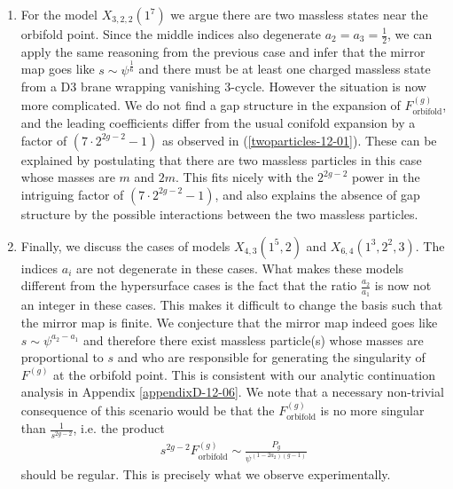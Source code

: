 \documentclass[12pt]{article}
\begin{document}
\begin{enumerate}
\item For the model $X_{3,2,2}(1^7)$ we argue there are two
massless states near the orbifold point. Since the middle indices
also degenerate $a_2=a_3=\frac{1}{2}$, we can apply the same
reasoning from the previous case and infer that the mirror map
goes like $s\sim \psi^{\frac{1}{6}}$ and there must be at
least one charged massless state from a D3 brane wrapping
vanishing 3-cycle. However the situation is now more complicated.
We do not find a gap structure in the expansion of
$F^{(g)}_{\textrm{orbifold}}$, and the leading coefficients differ
from the usual conifold expansion by a factor of $(7\cdot
2^{2g-2}-1)$ as observed in (\ref{twoparticles-12-01}). These can
be explained by postulating that there are two massless particles
in this case whose masses are $m$ and $2m$. This fits nicely with
the $2^{2g-2}$ power in the intriguing factor of $(7\cdot
2^{2g-2}-1)$, and also explains the absence of gap structure by
the possible interactions between the two massless particles.

\item Finally, we discuss the cases of models $X_{4,3}(1^5,2)$ and
$X_{6,4}(1^3,2^2,3)$. The indices $a_i$ are not degenerate in
these cases. What makes these models different from the
hypersurface cases is the fact that the ratio $\frac{a_2}{a_1}$ is
now not an integer in these cases. This makes it difficult to
change the basis such that the mirror map is finite. We conjecture
that the mirror map indeed goes like $s\sim \psi^{a_2-a_1}$ and
therefore there exist massless particle(s) whose masses are
proportional to $s$ and who are responsible for generating the
singularity of $F^{(g)}$ at the orbifold point. This is consistent
with our analytic continuation analysis in Appendix
\ref{appendixD-12-06}. We note that a necessary non-trivial
consequence of this scenario would be that the
$F^{(g)}_{\textrm{orbifold}}$ is no more singular than
$\frac{1}{s^{2g-2}}$, i.e. the product
\begin{eqnarray}
s^{2g-2}F^{(g)}_{\textrm{orbifold}}\sim
\frac{P_g}{\psi^{(1-2a_2)(g-1)}}
\end{eqnarray}
should be regular. This is precisely what we observe
experimentally.




\end{enumerate}
\end{document}
